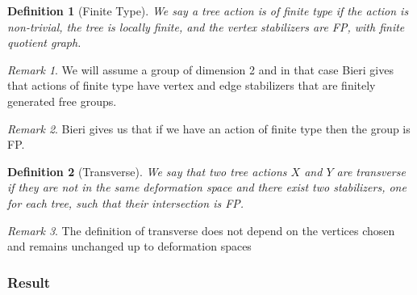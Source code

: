 \documentclass{article}
\theoremstyle{mystyle}
\newtheorem{defn}{Definition}
\theoremstyle{remark}
\newtheorem{rmk}{Remark}[section]
\begin{document}
\begin{defn}[Finite Type]
We say a tree action is of \emph{finite type} if the action is non-trivial, the tree is locally finite, and the vertex stabilizers are FP, with finite quotient graph.
\end{defn}

\begin{rmk}
    We will assume a group of dimension 2 and in that case Bieri gives that actions of finite type have vertex and edge stabilizers that are finitely generated free groups.
\end{rmk}

\begin{rmk}
    Bieri gives us that if we have an action of finite type then the group is FP.
\end{rmk}

\begin{defn}[Transverse]
    We say that two tree actions $X$ and $Y$ are \emph{transverse} if they are not in the same deformation space and there exist two stabilizers, one for each tree, such that their intersection is FP.
\end{defn}

\begin{rmk}
    The definition of transverse does not depend on the vertices chosen and remains unchanged up to deformation spaces
\end{rmk}

\subsubsection{Result}
\end{document}
